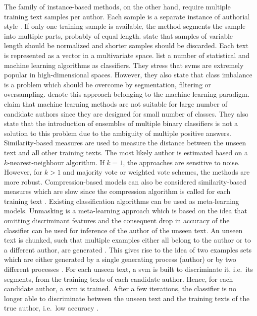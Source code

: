 The family of instance-based methods, on the other hand, require multiple training text samples per author. 
Each sample is a separate instance of authorial style \citep{stamatatos_survey_2009,altakrori_topic_2021,elmanarelbouanani_authorship_2014,neal_surveying_2018}.
If only one training sample is available, the method segments the sample into multiple parts, probably of equal length.
\citet{stamatatos_survey_2009} state that samples of variable length should be normalized and 
shorter samples should be discarded.
Each text is represented as a vector in a multivariate space.
\citet{stamatatos_survey_2009} list a number of statistical and machine learning algorithms as classifiers.
They stress that \acp{svm} are extremely popular in high-dimensional spaces.
However, they also state that class imbalance is a problem 
which should be overcome by segmentation, filtering or oversampling.
\citet{koppel_authorship_2011,koppel_determining_2014} denote this approach belonging to the machine learning paradigm.
\citet{koppel_determining_2014} claim that machine learning methods are not suitable for large number of candidate authors 
since they are designed for small number of classes. 
They also state that the introduction of ensembles of multiple binary classifiers is not a solution to this problem 
due to the ambiguity of multiple positive answers.
Similarity-based measures are used to measure the distance between the unseen text and all other training texts.
The most likely author is estimated based on a $k$-nearest-neighbour algorithm.
If $k=1$, the approaches are sensitive to noise.
However, for $k>1$ and majority vote or weighted vote schemes, the methods are more robust.
Compression-based models can also be considered similarity-based measures which are slow 
since the compression algorithm is called for each training text \citep{stamatatos_survey_2009,neal_surveying_2018}.
Existing classification algorithms can be used as meta-learning models.
Unmasking is a meta-learning approach which is based on the idea that
omitting discriminant features and the consequent drop in accuracy of the classifier 
can be used for inference of the author of the unseen text.
An unseen text is chunked, such that multiple examples either all belong to the author or to a different author, 
are generated \citep{koppel_authorship_2004}.
This gives rise to the idea of two examples sets which are either generated by a single generating process (author) 
or by two different processes \citep{koppel_authorship_2004}.
For each unseen text, a \ac{svm} is built to discriminate it, i.e.\ its segments, 
from the training texts of each candidate author.
Hence, for each candidate author, a \ac{svm} is trained.
After a few iterations, the classifier is no longer able to discriminate between the unseen text and 
the training texts of the true author, i.e.\ low accuracy \citep{stamatatos_survey_2009,koppel_authorship_2004}.


